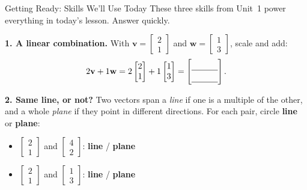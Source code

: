 \documentclass[10pt]{article}
\newcommand{\vv}{\mathbf{v}}
\newcommand{\ww}{\mathbf{w}}
\begin{document}
\namedateperiod

\vspace{0.12in}

\begin{notesbox}{Getting Ready: Skills We'll Use Today}
\small These three skills from Unit~1 power everything in today's lesson. Answer quickly.

\vspace{4pt}
\textbf{1. A linear combination.} With $\vv=\begin{bmatrix} 2 \\ 1 \end{bmatrix}$ and
$\ww=\begin{bmatrix} 1 \\ 3 \end{bmatrix}$, scale and add:
\[
  2\vv + 1\ww = 2\begin{bmatrix} 2 \\ 1 \end{bmatrix} + 1\begin{bmatrix} 1 \\ 3 \end{bmatrix}
  = \begin{bmatrix}\rule{0pt}{1.1em}\blank{1.1cm}\\[2pt]\blank{1.1cm}\end{bmatrix}.
\]

\vspace{4pt}
\textbf{2. Same line, or not?} Two vectors span a \emph{line} if one is a multiple of the other,
and a whole \emph{plane} if they point in different directions. For each pair, circle
\textbf{line} or \textbf{plane}:
\begin{itemize}[leftmargin=1.4em, itemsep=3pt]
  \item $\begin{bmatrix} 2 \\ 1 \end{bmatrix}$ and $\begin{bmatrix} 4 \\ 2 \end{bmatrix}$:
        \hfill \textbf{line} \qquad / \qquad \textbf{plane}
  \item $\begin{bmatrix} 2 \\ 1 \end{bmatrix}$ and $\begin{bmatrix} 1 \\ 3 \end{bmatrix}$:
        \hfill \textbf{line} \qquad / \qquad \textbf{plane}
\end{itemize}


\end{notesbox}
\end{document}
